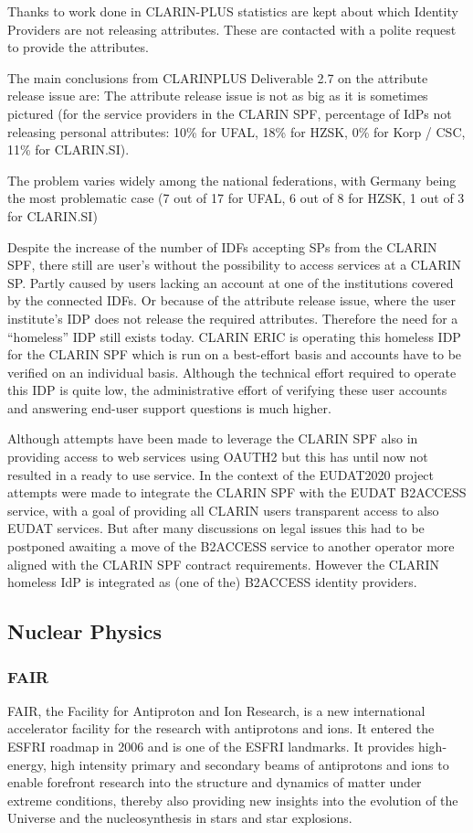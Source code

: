 \documentclass[fleqn,11pt]{wlscirep}
\begin{document}
{Thanks to work done in CLARIN-PLUS\cite{Mistuka} statistics are kept about which Identity Providers are not releasing attributes. These are contacted with a polite request to provide the attributes.

The main conclusions from CLARINPLUS Deliverable 2.7 on the attribute release issue are:
The attribute release issue is not as big as it is sometimes pictured (for the service providers in the CLARIN SPF, percentage of IdPs not releasing personal attributes: 10\% for UFAL, 18\% for HZSK, 0\% for Korp / CSC, 11\% for CLARIN.SI).

The problem varies widely among the national federations, with Germany being the most problematic case (7 out of 17 for UFAL, 6 out of 8 for HZSK, 1 out of 3 for CLARIN.SI)

Despite the increase of the number of IDFs accepting SPs from  the CLARIN SPF, there still are user's without the possibility to access services at a CLARIN SP.  Partly caused by users lacking an account at one of the institutions covered by the connected IDFs. Or because of the attribute release issue, where the user institute’s  IDP does not release the required attributes. Therefore the need for a “homeless” IDP still exists today. CLARIN ERIC is operating this homeless IDP for the CLARIN SPF which  is run on a best-effort basis and accounts have to be verified on an individual basis. Although the technical effort required to operate this IDP is quite low, the administrative effort of verifying these user accounts and answering end-user support questions is much higher.

Although attempts have been made to leverage the CLARIN SPF also in providing access to web services using OAUTH2 but this has until now not resulted in a ready to use service. In the context of the EUDAT2020 project attempts were made to integrate the CLARIN SPF with the EUDAT B2ACCESS service, with a goal of providing all CLARIN users transparent access to also EUDAT services. But after many discussions on legal issues this had to be postponed awaiting a move of the B2ACCESS service to another operator more aligned with the CLARIN SPF contract requirements. However the CLARIN homeless IdP is integrated as (one of the) B2ACCESS identity providers.

\subsection{Nuclear Physics}
\subsubsection{FAIR}
FAIR, the Facility for Antiproton and Ion Research, is a new international accelerator facility for the research with antiprotons and ions. It entered the ESFRI roadmap in 2006 and is one of the ESFRI landmarks. It provides high-energy, high intensity primary and secondary beams of antiprotons and ions to enable forefront research into the structure and dynamics of matter under extreme conditions, thereby also providing new insights into the evolution of the Universe and the nucleosynthesis in stars and star explosions.
 
}
\end{document}
